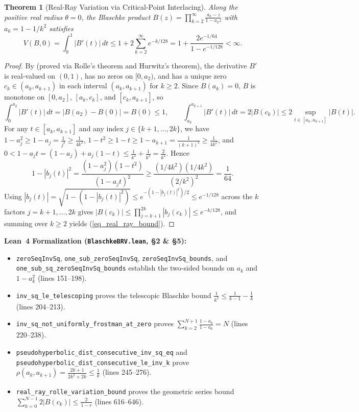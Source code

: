\documentclass[11pt,reqno]{amsart}
\newtheorem{thm}{Theorem}[section]
\numberwithin{equation}{section}
\begin{document}
\begin{thm}[Real-Ray Variation via Critical-Point Interlacing] \label{thm_real_ray}
Along the positive real radius $\theta = 0$, the Blaschke product $B(z) = \prod_{k=2}^\infty \frac{a_k - z}{1 - a_k z}$ with $a_k = 1 - 1/k^2$ satisfies
\begin{equation} \label{eq_real_ray_bound}
  V(B, 0) = \int_0^1 |B'(t)|\,dt \le 1 + 2 \sum_{k=2}^\infty e^{-k/128} = 1 + \frac{2 e^{-1/64}}{1 - e^{-1/128}} < \infty.
\end{equation}
\end{thm}
\begin{proof}
By \cite[Lemma~2.9]{AJS14} (proved via Rolle's theorem and Hurwitz's theorem), the derivative $B'$ is real-valued on $(0, 1)$, has no zeros on $[0, a_2)$, and has a unique zero $c_k \in (a_k, a_{k+1})$ in each interval $(a_k, a_{k+1})$ for $k \ge 2$. Since $B(a_k) = 0$, $B$ is monotone on $[0, a_2]$, $[a_k, c_k]$, and $[c_k, a_{k+1}]$, so
\[
  \int_0^{a_2} |B'(t)|\,dt = |B(a_2) - B(0)| = B(0) \le 1, \qquad
  \int_{a_k}^{a_{k+1}} |B'(t)|\,dt = 2|B(c_k)| \le 2 \sup_{t \in [a_k, a_{k+1}]} |B(t)|.
\]
For any $t \in [a_k, a_{k+1}]$ and any index $j \in \{k+1, \dots, 2k\}$, we have $1 - a_j^2 \ge 1 - a_j = \frac{1}{j^2} \ge \frac{1}{4k^2}$, $1 - t^2 \ge 1 - t \ge 1 - a_{k+1} = \frac{1}{(k+1)^2} \ge \frac{1}{4k^2}$, and $0 < 1 - a_j t = (1 - a_j) + a_j(1 - t) \le \frac{1}{k^2} + \frac{1}{k^2} = \frac{2}{k^2}$. Hence
\[
  1 - |b_j(t)|^2 = \frac{(1 - a_j^2)(1 - t^2)}{(1 - a_j t)^2} \ge \frac{(1/4k^2)(1/4k^2)}{(2/k^2)^2} = \frac{1}{64}.
\]
Using $|b_j(t)| = \sqrt{1 - (1 - |b_j(t)|^2)} \le e^{-(1 - |b_j(t)|^2)/2} \le e^{-1/128}$ across the $k$ factors $j = k+1, \dots, 2k$ gives $|B(c_k)| \le \prod_{j=k+1}^{2k} |b_j(c_k)| \le e^{-k/128}$, and summing over $k \ge 2$ yields (\ref{eq_real_ray_bound}).
\end{proof}

\begin{leveltwo}
\noindent\textbf{\textcolor{leannote}{Lean~4 Formalization (\texttt{BlaschkeBRV.lean}, \S 2 \& \S 5):}}
\begin{itemize}
\item \texttt{zeroSeqInvSq}, \texttt{one\_sub\_zeroSeqInvSq}, \texttt{zeroSeqInvSq\_bounds}, and \texttt{one\_sub\_sq\_zeroSeqInvSq\_bounds} establish the two-sided bounds on $a_k$ and $1 - a_k^2$ (lines 151--198).
\item \texttt{inv\_sq\_le\_telescoping} proves the telescopic Blaschke bound $\frac{1}{k^2} \le \frac{1}{k-1} - \frac{1}{k}$ (lines 204--213).
\item \texttt{inv\_sq\_not\_uniformly\_frostman\_at\_zero} proves $\sum_{k=2}^{N+1} \frac{1-a_k}{1-a_k} = N$ (lines 220--238).
\item \texttt{pseudohyperbolic\_dist\_consecutive\_inv\_sq\_eq} and \texttt{pseudohyperbolic\_dist\_consecutive\_le\_inv\_k} prove $\rho(a_k, a_{k+1}) = \frac{2k+1}{2k^2+2k} \le \frac{1}{k}$ (lines 245--276).
\item \texttt{real\_ray\_rolle\_variation\_bound} proves the geometric series bound $\sum_{k=0}^{N-1} 2|B(c_k)| \le \frac{2}{1 - r}$ (lines 616--646).
\end{itemize}
\end{leveltwo}
\end{document}
